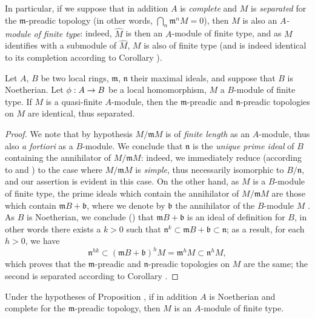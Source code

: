 In particular, if we suppose that in addition $A$ is \emph{complete} and $M$ is
\emph{separated} for the $\mathfrak{m}$-preadic topology (in other words,
$\bigcap_n\mathfrak{m}^n M=0$), then $M$ is also an \emph{$A$-module of finite type}: indeed,
$\widehat{M}$ is then an $A$-module of finite type, and as $M$ identifies with a submodule of
$\widehat{M}$, $M$ is also of finite type (and is indeed identical to its completion
according to Corollary ).

\begin{proposition}[7.4.2]
\label{0.7.4.2}
Let $A$, $B$ be two local rings, $\mathfrak{m}$, $\mathfrak{n}$ their maximal ideals, and
suppose that $B$ is Noetherian. Let $\vphi:A\to B$ be a local homomorphism, $M$ a $B$-module
of finite type. If $M$ is a quasi-finite $A$-module, then the $\mathfrak{m}$-preadic and
$\mathfrak{n}$-preadic topologies on $M$ are identical, thus separated.
\end{proposition}

\begin{proof}
We note that by hypothesis $M/\mathfrak{m}M$ is of \emph{finite length} as an $A$-module,
thus also \emph{a fortiori} as a $B$-module. We conclude that $\mathfrak{n}$ is the
\emph{unique prime ideal} of $B$ containing the annihilator of $M/\mathfrak{m}M$: indeed, we
immediately reduce (according to  and
) to the case where $M/\mathfrak{m}M$ is \emph{simple}, thus
necessarily isomorphic to $B/\mathfrak{n}$, and our assertion is evident in this case. On
the other hand, as $M$ is a $B$-module of finite type, the prime ideals which contain the
annihilator of $M/\mathfrak{m}M$ are those which contain $\mathfrak{m}B+\mathfrak{b}$, where
we denote by $\mathfrak{b}$ the annihilator of the $B$-module $M$
. As $B$ is Noetherian, we conclude
(\cite[p.~127, Cor.~4]{I-11}) that $\mathfrak{m}B+\mathfrak{b}$ is an ideal
of definition for $B$, in other words there exists a $k>0$ such that
$\mathfrak{n}^k\subset\mathfrak{m}B+\mathfrak{b}\subset\mathfrak{n}$; as a result, for each
$h>0$, we have
\[
  \mathfrak{n}^{hk}\subset(\mathfrak{m}B+\mathfrak{b})^h M
  =\mathfrak{m}^h M\subset\mathfrak{n}^h M,
\]
which proves that the $\mathfrak{m}$-preadic and $\mathfrak{n}$-preadic topologies on $M$
are the same; the second is separated according to Corollary .
\end{proof}

\begin{corollary}[7.4.3]
\label{0.7.4.3}
Under the hypotheses of Proposition , if in addition $A$ is
Noetherian and complete for the $\mathfrak{m}$-preadic topology, then $M$ is an $A$-module
of finite type.
\end{corollary}

